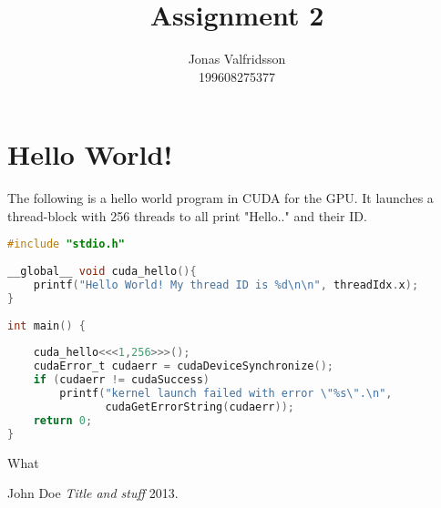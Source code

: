 \documentclass{article}
\title{Assignment 2}
\date{}
\author{Jonas Valfridsson\\199608275377}
\begin{document}
\maketitle
\tableofcontents

\section*{Hello World!}%
\label{sec:hello_world_}


The following is a hello world program in CUDA for the GPU. It launches a thread-block with 256 threads to all print "Hello.." and their ID.

\begin{mdframed}[backgroundcolor=codeColor,leftmargin=0.0cm,hidealllines=true,%
  innerleftmargin=0.1cm,innerrightmargin=0.1cm,innertopmargin=0.5cm,innerbottommargin=0.10cm,
  roundcorner=15pt]
\begin{lstlisting}[language=C]
#include "stdio.h"
 
__global__ void cuda_hello(){
    printf("Hello World! My thread ID is %d\n\n", threadIdx.x);
}
 
int main() {
    
    cuda_hello<<<1,256>>>(); 
    cudaError_t cudaerr = cudaDeviceSynchronize();
    if (cudaerr != cudaSuccess)
        printf("kernel launch failed with error \"%s\".\n",
               cudaGetErrorString(cudaerr));
    return 0;
}
\end{lstlisting}
\end{mdframed}


What

\begin{thebibliography}{1}

 John Doe {\em Title and stuff}  2013.

\end{thebibliography}
\end{document}
